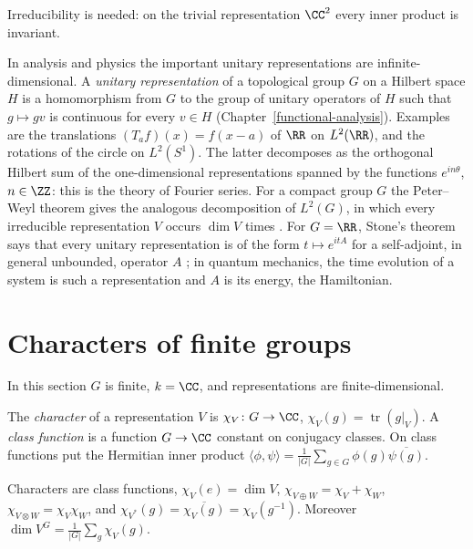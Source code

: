 Irreducibility is needed: on the trivial representation $\CC^2$ every inner product is invariant.

\begin{remark}\label{representation-theory:remark-unitary-infinite}
In analysis and physics the important unitary representations are infinite-dimensional. A \emph{unitary representation} of a topological group $G$ on a Hilbert space $H$ is a homomorphism
from $G$ to the group of unitary operators of $H$ such that $g \mapsto gv$ is continuous for every $v \in H$ (Chapter~\ref{functional-analysis}). Examples are the translations
$(T_af)(x) = f(x - a)$ of $\RR$ on $L^2(\RR)$, and the rotations of the circle on $L^2(S^1)$. The latter decomposes as the orthogonal Hilbert sum of the one-dimensional representations
spanned by the functions $e^{in\theta}$, $n \in \ZZ$: this is the theory of Fourier series. For a compact group $G$ the Peter--Weyl theorem gives the analogous decomposition of $L^2(G)$, in
which every irreducible representation $V$ occurs $\dim V$ times \cite[Chapter III]{brocker-tomdieck}. For $G = \RR$, Stone's theorem says that every unitary representation is of the form
$t \mapsto e^{itA}$ for a self-adjoint, in general unbounded, operator $A$ \cite[Theorem VIII.8]{reed-simon-1}; in quantum mechanics, the time evolution of a system is such a representation and
$A$ is its energy, the Hamiltonian.
\end{remark}

\section{Characters of finite groups}\label{representation-theory:section-characters}

In this section $G$ is finite, $k = \CC$, and representations are finite-dimensional.

\begin{definition}\label{representation-theory:definition-character}
The \emph{character} of a representation $V$ is $\chi_V \colon G \to \CC$, $\chi_V(g) = \operatorname{tr}(g|_V)$. A
\emph{class function} is a function $G \to \CC$ constant on conjugacy classes. On class functions put the
Hermitian inner product $\langle \phi, \psi \rangle = \frac{1}{|G|}\sum_{g \in G}\phi(g)\overline{\psi(g)}$.
\end{definition}

\begin{proposition}\label{representation-theory:proposition-character-properties}
Characters are class functions, $\chi_V(e) = \dim V$, $\chi_{V \oplus W} = \chi_V + \chi_W$,
$\chi_{V \otimes W} = \chi_V\chi_W$, and $\chi_{V^*}(g) = \overline{\chi_V(g)} = \chi_V(g^{-1})$. Moreover
$\dim V^G = \frac{1}{|G|}\sum_g \chi_V(g)$.
\end{proposition}

